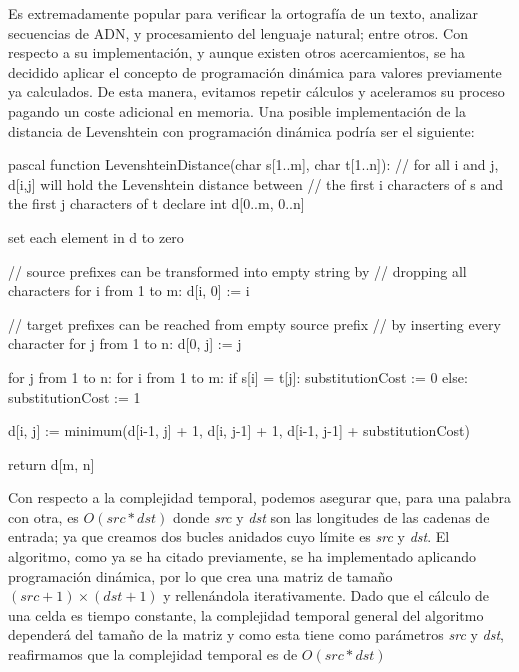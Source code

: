 Es extremadamente popular para verificar la ortografía de un texto, analizar secuencias de ADN,  y procesamiento del lenguaje natural; entre otros. Con respecto a su implementación, y aunque existen otros acercamientos, se ha decidido aplicar el concepto de programación dinámica para  valores previamente ya calculados. De esta manera, evitamos repetir cálculos y aceleramos su proceso pagando un coste adicional en memoria. Una posible implementación de la distancia de Levenshtein con programación dinámica podría ser el siguiente:

\begin{code}{\scriptsize}{pascal}
function LevenshteinDistance(char s[1..m], char t[1..n]):
  // for all i and j, d[i,j] will hold the Levenshtein distance between
  // the first i characters of s and the first j characters of t
  declare int d[0..m, 0..n]
 
  set each element in d to zero
 
  // source prefixes can be transformed into empty string by
  // dropping all characters
  for i from 1 to m:
    d[i, 0] := i
 
  // target prefixes can be reached from empty source prefix
  // by inserting every character
  for j from 1 to n:
    d[0, j] := j
 
  for j from 1 to n:
    for i from 1 to m:
      if s[i] = t[j]:
        substitutionCost := 0
      else:
        substitutionCost := 1

      d[i, j] := minimum(d[i-1, j] + 1,                   
                         d[i, j-1] + 1,                   
                         d[i-1, j-1] + substitutionCost)  
 
  return d[m, n]
\end{code}

Con respecto a la complejidad temporal, podemos asegurar que, para una palabra con otra, es $O(src * dst)$ donde \textit{src} y \textit{dst} son las longitudes de las cadenas de entrada; ya que creamos dos bucles anidados cuyo límite es \textit{src} y \textit{dst}. El algoritmo, como ya se ha citado previamente, se ha implementado aplicando programación dinámica, por lo que crea una matriz de tamaño $(src + 1) \times (dst + 1)$ y rellenándola iterativamente. Dado que el cálculo de una celda es tiempo constante, la complejidad temporal general del algoritmo dependerá del tamaño de la matriz y como esta tiene como parámetros \textit{src} y \textit{dst}, reafirmamos que la complejidad temporal es de $O(src * dst)$ \\

